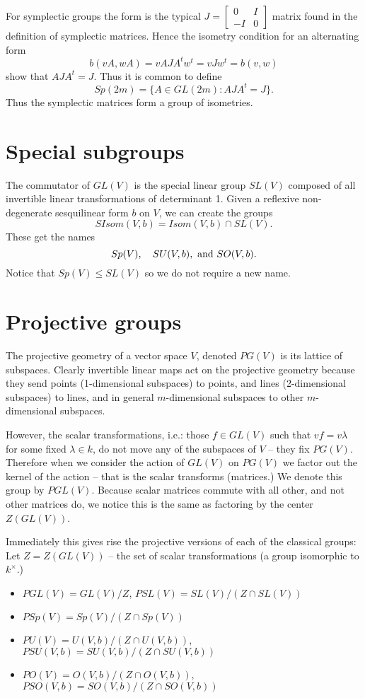 \documentclass[12pt]{article}
\providecommand{\intersect}{\cap}
\begin{document}
For symplectic groups the form is the typical $J=\begin{bmatrix} 0 & I\\ -I & 0\end{bmatrix}$ matrix found in the definition of symplectic matrices.
Hence the isometry condition for an alternating form
\[b(vA,wA)=vAJA^t w^t=vJw^t=b(v,w)\]
show that $AJA^t=J$.  Thus it is common to define 
\[Sp(2m)=\{A\in GL(2m): AJA^t=J\}.\]
Thus the symplectic matrices form a group of isometries.


\section{Special subgroups}

The commutator of $GL(V)$ is the special linear group $SL(V)$ composed of all invertible linear transformations of determinant 1.  Given a reflexive non-degenerate sesquilinear form $b$ on $V$, we can create the groups 
\[SIsom(V,b)=Isom(V,b)\intersect SL(V).\]
These get the names
\[Sp(V),\quad SU(V,b), \textnormal{ and } SO(V,b).\]
Notice that $Sp(V)\leq SL(V)$ so we do not require a new name.

\section{Projective groups}

The projective geometry of a vector space $V$, denoted $PG(V)$ is its lattice of subspaces.  Clearly invertible linear maps act on the projective geometry because they send points (1-dimensional subspaces) to points, and lines (2-dimensional subspaces) to lines, and in general $m$-dimensional subspaces to other $m$-dimensional subspaces.  

However, the scalar transformations, i.e.: those $f\in GL(V)$ such that $vf=v\lambda$ for some fixed $\lambda\in k$, do not move any of the subspaces of $V$ -- they fix $PG(V)$.  Therefore when we consider the action of $GL(V)$ on $PG(V)$ we factor out the kernel of the action -- that is the scalar transforms (matrices.)  We denote this group by $PGL(V)$.  Because scalar matrices commute with all other, and not other matrices do, we notice this is the same as factoring by the center $Z(GL(V))$.

Immediately this gives rise the projective versions of each of the classical groups: Let $Z=Z(GL(V))$ -- the set of scalar transformations (a group isomorphic to $k^\times$.)
\begin{itemize}
\item $PGL(V)=GL(V)/Z$, $PSL(V)=SL(V)/(Z\intersect SL(V))$
\item $PSp(V)=Sp(V)/(Z\intersect Sp(V))$
\item $PU(V)=U(V,b)/(Z\intersect U(V,b))$, $PSU(V,b)=SU(V,b)/(Z\intersect SU(V,b))$
\item $PO(V)=O(V,b)/(Z\intersect O(V,b))$, $PSO(V,b)=SO(V,b)/(Z\intersect SO(V,b))$
\end{itemize}
\end{document}
